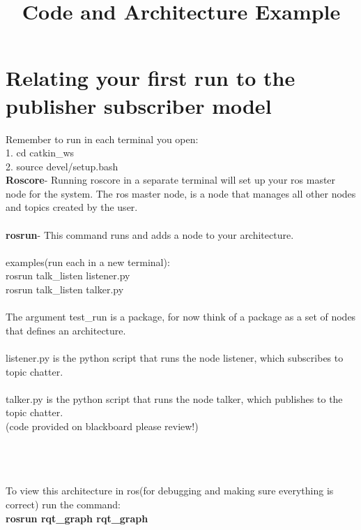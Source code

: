 \documentclass{article}
\title{Code and Architecture Example}
\author{}
\date{}
\begin{document}
\maketitle
{}
         
\section{Relating your first run to the publisher subscriber model}
Remember to run in each terminal you open:\\
1. cd catkin\_ws\\ 
2. source devel/setup.bash\\
\textbf{Roscore}- Running roscore in a separate terminal will set up your ros master node for the system. The ros master node, is a node that manages all other nodes and topics created by the user. \\\\
\textbf{rosrun}- This command runs and adds a node to your architecture.\\\\
examples(run each in a new terminal):\\ 
rosrun talk\_listen listener.py\\ 
rosrun talk\_listen talker.py\\\\
The argument test\_run is a package, for now think of a package as a  set of nodes that defines an architecture.\\\\
listener.py is the python script that runs the node listener, which subscribes to topic chatter.\\\\
talker.py is the python script that runs the node talker, which publishes to the topic chatter. \\
(code provided on blackboard please review!)\\\\
\\\\
To view this architecture in ros(for debugging and making sure everything is correct) run the command: \\
\textbf{rosrun rqt\_graph rqt\_graph}
\end{document}
